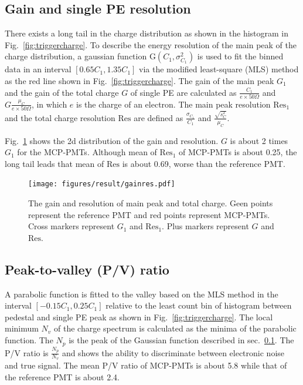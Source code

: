 \subsection{Gain and single PE resolution}
\label{sec:noisegain}

There exists a long tail in the charge distribution as shown in the histogram in Fig.~\ref{fig:triggercharge}. To describe the energy resolution of the main peak of the charge distribution, a gaussian function G$(C_1,\sigma^2_{C_1})$ is used to fit the binned data in an interval $[0.65C_1, 1.35C_1]$ via the modified least-square (MLS) method \cite{Cowan1998StatisticalDA} as the red line shown in Fig.~\ref{fig:triggercharge}. The gain of the main peak $G_1$ and the gain of the total charge $G$ of single PE are calculated as $\frac{C_1}{e\times 50\Omega}$ and $G\frac{\mu_{C}}{e\times 50\Omega}$, in which $e$ is the charge of an electron. The main peak resolution $\mathrm{Res}_1$ and the total charge resolution $\mathrm{Res}$ are defined as $\frac{\sigma_{C_1}}{C_1}$ and $\frac{\sqrt{s^2_{C}}}{\mu_{C}}$.

Fig.~\ref{fig:totalchargeCompare} shows the 2d distribution of the gain and resolution. $G$ is about 2 times $G_1$ for the MCP-PMTs. Although mean of $\mathrm{Res}_1$ of MCP-PMTs is about 0.25, the long tail leads that mean of $\mathrm{Res}$ is about 0.69, worse than the reference PMT.

\begin{figure}[!htbp]
    \centering
    \texttt{[image: figures/result/gainres.pdf]}
    \caption{The gain and resolution of main peak and total charge. Geen points represent the reference PMT and red points represent MCP-PMTs. Cross markers represent $G_1$ and $\mathrm{Res}_1$. Plus markers represent $G$ and $\mathrm{Res}$.}
    \label{fig:totalchargeCompare}
\end{figure}

\subsection{Peak-to-valley (P/V) ratio}
A parabolic function is fitted to the valley based on the MLS method in the interval $[-0.15C_1, 0.25C_1]$ relative to the least count bin of histogram between pedestal and single PE peak as shown in Fig.~\ref{fig:triggercharge}. The local minimum $N_v$ of the charge spectrum is calculated as the minima of the parabolic function. The $N_p$ is the peak of the Gaussian function described in sec.~\ref{sec:noisegain}. The P/V ratio is $\frac{N_p}{N_v}$ and shows the ability to discriminate between electronic noise and true signal. The mean P/V ratio of MCP-PMTs is about 5.8 while that of the reference PMT is about 2.4.

